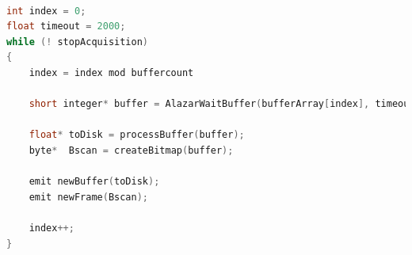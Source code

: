 \begin{lstlisting}[float=b,language=C,frame=tb,caption={A floating example (\texttt{listings} manual)},label=lst:useless]

int index = 0;
float timeout = 2000;
while (! stopAcquisition)
{
	index = index mod buffercount
	
	short integer* buffer = AlazarWaitBuffer(bufferArray[index], timeout);
	
	float* toDisk = processBuffer(buffer);
	byte*  Bscan = createBitmap(buffer);
	
	emit newBuffer(toDisk);
	emit newFrame(Bscan);
	
	index++;
}
\end{lstlisting}
